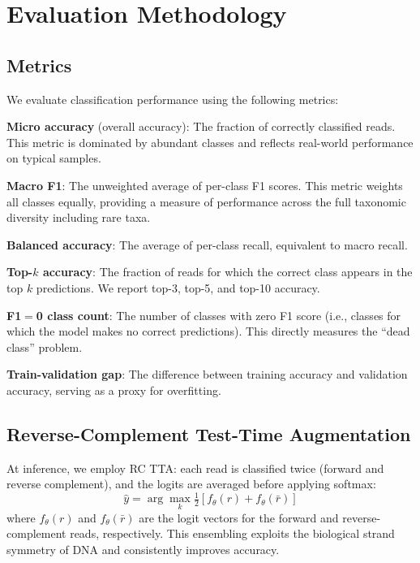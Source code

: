\section{Evaluation Methodology}
\label{sec:method-eval}

\subsection{Metrics}

We evaluate classification performance using the following metrics:

\textbf{Micro accuracy} (overall accuracy): The fraction of correctly classified reads. This metric is dominated by abundant classes and reflects real-world performance on typical samples.

\textbf{Macro F1}: The unweighted average of per-class F1 scores. This metric weights all classes equally, providing a measure of performance across the full taxonomic diversity including rare taxa.

\textbf{Balanced accuracy}: The average of per-class recall, equivalent to macro recall.

\textbf{Top-$k$ accuracy}: The fraction of reads for which the correct class appears in the top $k$ predictions. We report top-3, top-5, and top-10 accuracy.

\textbf{F1$=$0 class count}: The number of classes with zero F1 score (i.e., classes for which the model makes no correct predictions). This directly measures the ``dead class'' problem.

\textbf{Train-validation gap}: The difference between training accuracy and validation accuracy, serving as a proxy for overfitting.

\subsection{Reverse-Complement Test-Time Augmentation}
\label{sec:method-rc-tta}

At inference, we employ RC TTA: each read is classified twice (forward and reverse complement), and the logits are averaged before applying softmax:
\begin{equation}
    \hat{y} = \arg\max_k \tfrac{1}{2}\left[ f_\theta(r) + f_\theta(\bar{r}) \right]
    \label{eq:rc-tta}
\end{equation}
where $f_\theta(r)$ and $f_\theta(\bar{r})$ are the logit vectors for the forward and reverse-complement reads, respectively. This ensembling exploits the biological strand symmetry of DNA and consistently improves accuracy.

